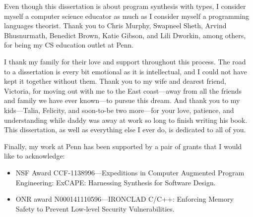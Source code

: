 Even though this dissertation is about program synthesis with types, I consider myself a computer science educator as much as I consider myself a programming languages theorist.
Thank you to Chris Murphy, Swapneel Sheth, Arvind Bhusnurmath, Benedict Brown, Katie Gibson, and Lili Dworkin, among others, for being my CS education outlet at Penn.

I thank my family for their love and support throughout this process.
The road to a dissertation is every bit emotional as it is intellectual, and I could not have kept it together without them.
Thank you to my wife and dearest friend, Victoria, for moving out with me to the East coast---away from all the friends and family we have ever known---to pursue this dream.
And thank you to my kids---Talia, Felicity, and soon-to-be two more---for your love, patience, and understanding while daddy was away at work so long to finish writing his book.
This dissertation, as well as everything else I ever do, is dedicated to all of you.

Finally, my work at Penn has been supported by a pair of grants that I would like to acknowledge:
\begin{itemize}
  \item NSF Award CCF-1138996---Expeditions in Computer Augmented Program Engineering: ExCAPE: Harnessing Synthesis for Software Design.
  \item ONR award N000141110596---IRONCLAD C/C++: Enforcing Memory Safety to Prevent Low-level Security Vulnerabilities.
\end{itemize}

